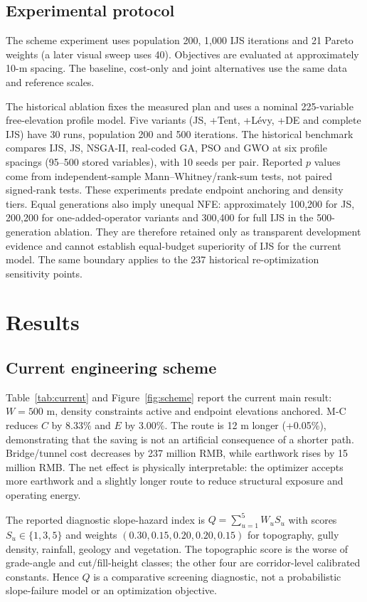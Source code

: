 \documentclass[preprint,12pt]{elsarticle}
\begin{document}
\subsection{Experimental protocol}

The scheme experiment uses population 200, 1,000 IJS iterations and 21 Pareto weights (a later visual sweep uses 40). Objectives are evaluated at approximately 10-m spacing. The baseline, cost-only and joint alternatives use the same data and reference scales.

The historical ablation fixes the measured plan and uses a nominal 225-variable free-elevation profile model. Five variants (JS, +Tent, +L\'evy, +DE and complete IJS) have 30 runs, population 200 and 500 iterations. The historical benchmark compares IJS, JS, NSGA-II, real-coded GA, PSO and GWO at six profile spacings (95--500 stored variables), with 10 seeds per pair. Reported $p$ values come from independent-sample Mann--Whitney/rank-sum tests, not paired signed-rank tests. These experiments predate endpoint anchoring and density tiers. Equal generations also imply unequal NFE: approximately 100,200 for JS, 200,200 for one-added-operator variants and 300,400 for full IJS in the 500-generation ablation. They are therefore retained only as transparent development evidence and cannot establish equal-budget superiority of IJS for the current model. The same boundary applies to the 237 historical re-optimization sensitivity points.

\section{Results}

\subsection{Current engineering scheme}

Table~\ref{tab:current} and Figure~\ref{fig:scheme} report the current main result: $W=500$ m, density constraints active and endpoint elevations anchored. M-C reduces $C$ by 8.33\% and $E$ by 3.00\%. The route is 12 m longer (+0.05\%), demonstrating that the saving is not an artificial consequence of a shorter path. Bridge/tunnel cost decreases by 237 million RMB, while earthwork rises by 15 million RMB. The net effect is physically interpretable: the optimizer accepts more earthwork and a slightly longer route to reduce structural exposure and operating energy.

The reported diagnostic slope-hazard index is $Q=\sum_{u=1}^{5}W_uS_u$ with scores $S_u\in\{1,3,5\}$ and weights $(0.30,0.15,0.20,0.20,0.15)$ for topography, gully density, rainfall, geology and vegetation. The topographic score is the worse of grade-angle and cut/fill-height classes; the other four are corridor-level calibrated constants. Hence $Q$ is a comparative screening diagnostic, not a probabilistic slope-failure model or an optimization objective.
\end{document}
